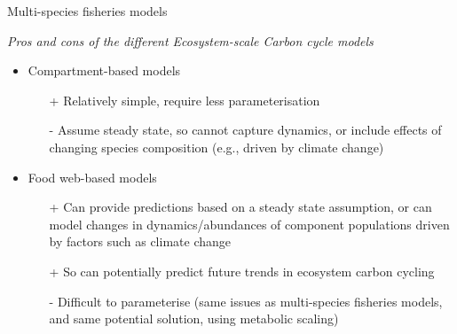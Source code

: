 \documentclass[xcolor={usenames,x11names},compress]{beamer}
\renewcommand{\(}{\begin{columns}}
\renewcommand{\)}{\end{columns}}
\newcommand{\<}[1]{\begin{column}{#1}}
\renewcommand{\>}{\end{column}}
\begin{document}
\begin{frame}{Multi-species fisheries models}

  \textit{Pros and cons of the different Ecosystem-scale Carbon cycle models}

  \begin{itemize} [<+->]\itemsep10pt
    \item Compartment-based models

    \begin{itemize} 
      \item[+] Relatively simple, require less parameterisation
      \item[-] Assume steady state, so cannot capture dynamics, or include effects of changing species composition (e.g., driven by climate change)
    \end{itemize}
    
    \item Food web-based models
    \begin{itemize} 
      \item[+] Can provide predictions based on a steady state assumption, or can model changes in dynamics/abundances of component populations driven by factors such as climate change
      \item[+] So can potentially predict future trends in ecosystem carbon cycling
      \item[-] Difficult to parameterise (same issues as multi-species fisheries models, and same potential solution, using metabolic scaling)
    \end{itemize}
  \end{itemize}

\end{frame}
\end{document}
